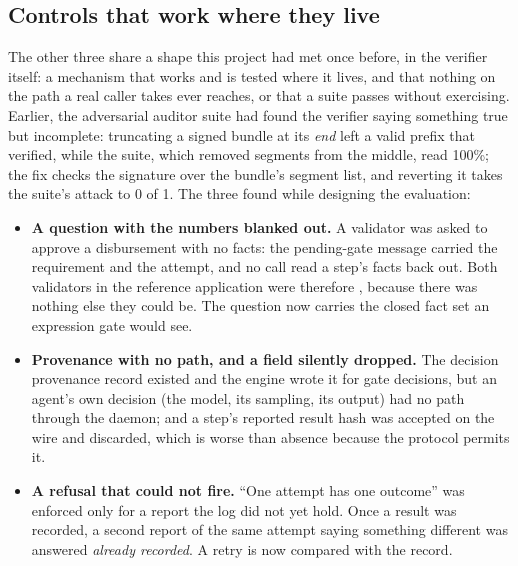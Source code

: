 \subsection{Controls that work where they live}
The other three share a shape this project had met once before, in the verifier
itself: a mechanism that works and is tested where it lives, and that nothing on
the path a real caller takes ever reaches, or that a suite passes without
exercising. Earlier, the adversarial auditor suite had found the verifier saying
something true but incomplete: truncating a signed bundle at its \emph{end} left a
valid prefix that verified, while the suite, which removed segments from the
middle, read 100\%; the fix checks the signature over the bundle's segment list,
and reverting it takes the suite's  attack to 0 of 1.
The three found while designing the evaluation:
\begin{itemize}
\item \textbf{A question with the numbers blanked out.} A validator was asked to
  approve a disbursement with no facts: the pending-gate message carried the
  requirement and the attempt, and no call read a step's facts back out. Both
  validators in the reference application were therefore , because there was nothing else they could be. The question now carries the closed fact set an expression gate
  would see.
\item \textbf{Provenance with no path, and a field silently dropped.} The decision
  provenance record existed and the engine wrote it for gate decisions, but an
  agent's own decision (the model, its sampling, its output) had no path
  through the daemon; and a step's reported result hash was accepted on the wire
  and discarded, which is worse than absence because the protocol permits it.
\item \textbf{A refusal that could not fire.} ``One attempt has one outcome'' was
  enforced only for a report the log did not yet hold. Once a result was
  recorded, a second report of the same attempt saying something different was
  answered \emph{already recorded}. A retry is now compared with the record.
\end{itemize}

